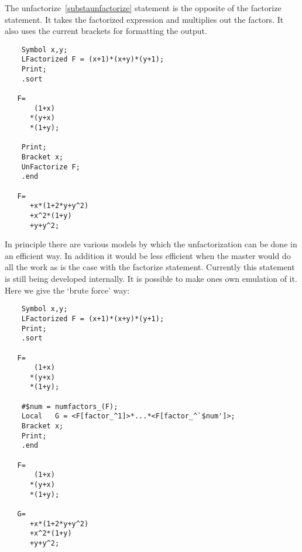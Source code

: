 \noindent The unfactorize~\ref{substaunfactorize} statement is the opposite 
of the factorize statement. It takes the factorized expression and 
multiplies out the factors. It also uses the current brackets for 
formatting the output.
\begin{verbatim}
    Symbol x,y;
    LFactorized F = (x+1)*(x+y)*(y+1);
    Print;
    .sort

   F=
       (1+x)
      *(y+x)
      *(1+y);

    Print;
    Bracket x;
    UnFactorize F;
    .end

   F=
      +x*(1+2*y+y^2)
      +x^2*(1+y)
      +y+y^2;
\end{verbatim}
\noindent In principle there are various models by which the 
unfactorization can be done in an efficient way. In addition it would be 
less efficient when the master would do all the work as is the case with 
the factorize statement. Currently this statement is still being developed 
internally. It is possible to make ones own emulation of it. Here we give 
the `brute force' way:
\begin{verbatim}
    Symbol x,y;
    LFactorized F = (x+1)*(x+y)*(y+1);
    Print;
    .sort

   F=
       (1+x)
      *(y+x)
      *(1+y);

    #$num = numfactors_(F);
    Local   G = <F[factor_^1]>*...*<F[factor_^`$num']>;
    Bracket x;
    Print;
    .end

   F=
       (1+x)
      *(y+x)
      *(1+y);

   G=
      +x*(1+2*y+y^2)
      +x^2*(1+y)
      +y+y^2;
\end{verbatim}


